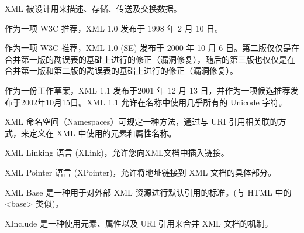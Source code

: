 XML 被设计用来描述、存储、传送及交换数据。


作为一项 W3C 推荐，XML 1.0 发布于 1998 年 2 月 10 日。

作为一项 W3C 推荐，XML 1.0 (SE) 发布于 2000 年 10 月 6 日。第二版仅仅是在合并第一版的勘误表的基础上进行的修正（漏洞修复），随后的第三版也仅仅是在合并第一版和第二版的勘误表的基础上进行的修正（漏洞修复）。

作为一份工作草案，XML 1.1 发布于2001 年 12 月 13 日，并作为一项候选推荐发布于2002年10月15日。XML 1.1 允许在名称中使用几乎所有的 Unicode 字符。

\begin{compactitem}
\item XML 命名空间（Namespaces）可规定一种方法，通过与 URI 引用相关联的方式，来定义在 XML 中使用的元素和属性名称。
\item XML Linking 语言 (XLink)，允许您向XML文档中插入链接。
\item XML Pointer 语言 (XPointer)，允许将地址链接到 XML 文档的具体部分。
\item XML Base 是一种用于对外部 XML 资源进行默认引用的标准。(与 HTML 中的 <base> 类似)。
\item XInclude 是一种使用元素、属性以及 URI 引用来合并 XML 文档的机制。
\end{compactitem}

